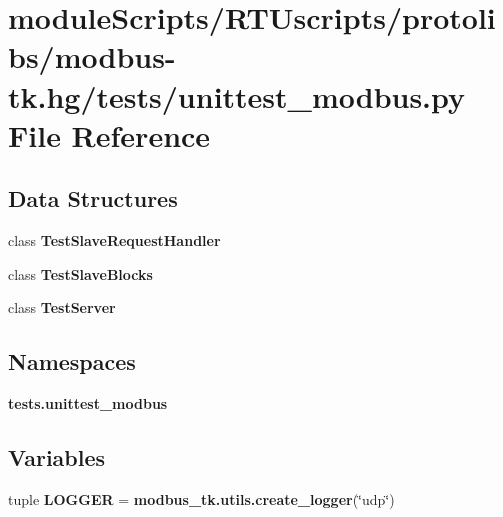 \section{module\+Scripts/\+R\+T\+Uscripts/protolibs/modbus-\/tk.hg/tests/unittest\+\_\+modbus.py File Reference}
\label{unittest__modbus_8py}
\subsection*{Data Structures}
\begin{DoxyCompactItemize}
\item 
class {\bf Test\+Slave\+Request\+Handler}
\item 
class {\bf Test\+Slave\+Blocks}
\item 
class {\bf Test\+Server}
\end{DoxyCompactItemize}
\subsection*{Namespaces}
\begin{DoxyCompactItemize}
\item 
 {\bf tests.\+unittest\+\_\+modbus}
\end{DoxyCompactItemize}
\subsection*{Variables}
\begin{DoxyCompactItemize}
\item 
tuple {\bf L\+O\+G\+G\+E\+R} = {\bf modbus\+\_\+tk.\+utils.\+create\+\_\+logger}(\char`\"{}udp\char`\"{})
\end{DoxyCompactItemize}
